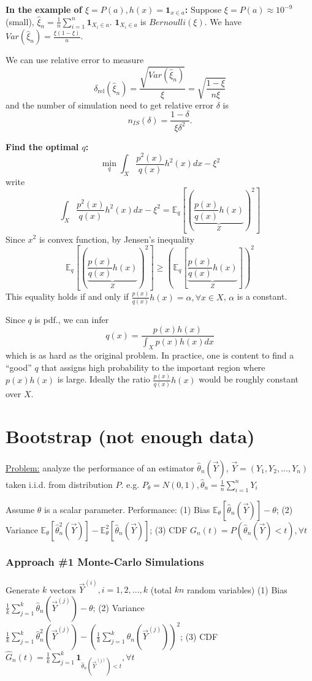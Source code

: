 \documentclass[11pt]{elegantbook}
\begin{document}
\textbf{In the example of $\xi=P(a), h(x)=\mathbf{1}_{x\in a}$:} Suppose $\xi=P(a)\approx 10^{-9}$ (small), $\hat{\xi}_n=\frac{1}{n}\sum_{i=1}^n\mathbf{1}_{X_i\in a}$. $\mathbf{1}_{X_i\in a}$ is $Bernoulli(\xi)$. We have $Var(\hat{\xi}_n)=\frac{\xi(1-\xi)}{n}$.

We can use relative error to measure $$\delta_{\mathrm{rel}}\left(\hat{\xi}_n\right)=\frac{\sqrt{Var(\hat{\xi}_n)}}{\xi}=\sqrt{\frac{1-\xi}{n\xi}}$$
and the number of simulation need to get relative error $\delta$ is $$
n_{I S}(\delta)=\frac{1-\delta} {\xi \delta^2} .
$$

\textbf{Find the optimal $q$:}
$$\min_q\int_X\frac{p^2(x)}{q(x)}h^2(x)dx-\xi^2$$
write $$\int_X\frac{p^2(x)}{q(x)}h^2(x)dx-\xi^2=\mathbb{E}_q\left[\left(\underbrace{\frac{p(x)}{q(x)}h(x)}_{Z}\right)^2\right]$$
Since $x^2$ is convex function, by Jensen's inequality
$$\mathbb{E}_q\left[\left(\underbrace{\frac{p(x)}{q(x)}h(x)}_{Z}\right)^2\right]\geq \left(\mathbb{E}_q\left[\underbrace{\frac{p(x)}{q(x)}h(x)}_{Z}\right]\right)^2$$
This equality holds if and only if $\frac{p(x)}{q(x)}h(x)=\alpha,\forall x\in X$, $\alpha$ is a constant.

Since $q$ is pdf., we can infer $$q(x)=\frac{p(x)h(x)}{\int_Xp(x)h(x)dx}$$
which is as hard as the original problem. In practice, one is content to find a “good” $q$ that assigns high probability to the important region where $p(x)h(x)$ is large. Ideally the ratio $\frac{p(x)}{q(x)}h(x)$ would be roughly constant over $X$.


\chapter{Bootstrap (not enough data)}
\underline{Problem:} analyze the performance of an estimator $\hat{\theta}_n(\vec{Y})$, $\vec{Y}=(Y_1,Y_2,...,Y_n)$ taken i.i.d. from distribution $P$. e.g. $P_{\theta}=N(0,1),\hat{\theta}_n=\frac{1}{n}\sum_{i=1}^nY_i$

Assume $\theta$ is a scalar parameter. Performance: (1) Bias $\mathbb{E}_{\theta}[\hat{\theta}_n(\vec{Y})]-\theta$; (2) Variance $\mathbb{E}_{\theta}[\hat{\theta}_n^2(\vec{Y})]-\mathbb{E}_{\theta}^2[\hat{\theta}_n(\vec{Y})]$; (3) CDF $G_{n}(t)=P(\hat{\theta}_n(\vec{Y})<t),\forall t$

\subsection*{Approach \#1 Monte-Carlo Simulations}
Generate $k$ vectors $\vec{Y}^{(i)},i=1,2,...,k$ (total $kn$ random variables)
(1) Bias $\frac{1}{k}\sum_{j=1}^k \hat{\theta}_n(\vec{Y}^{(j)})-\theta$; (2) Variance $\frac{1}{k}\sum_{j=1}^k \hat{\theta}^2_n(\vec{Y}^{(j)})-\left(\frac{1}{k}\sum_{j=1}^k \hat{\theta}_n(\vec{Y}^{(j)})\right)^2$; (3) CDF $\hat{G}_{n}(t)=\frac{1}{k}\sum_{j=1}^k \mathbf{1}_{\hat{\theta}_n(\vec{Y}^{(j)})<t},\forall t$
\end{document}
